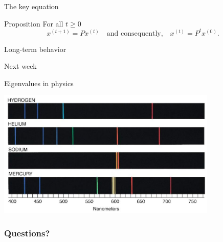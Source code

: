 \documentclass{beamer}
\begin{document}
\begin{frame}[t]{The key equation}
	\grid

	\vspace{-0.4cm}
	\begin{block}{Proposition}
		For all $t \geq 0$
		$$
		x^{(t+1)} = P x^{(t)}
		\quad \text{and consequently,} \quad
		x^{(t)} =  P^t x^{(0)}.
		$$
	\end{block}

\end{frame}

\begin{frame}[t]{Long-term behavior}
	\grid


\end{frame}

\begin{frame}[t]{Next week}
	\grid


\end{frame}
\begin{frame}{Eigenvalues in physics}
	\grid

	\includegraphics[width=10.5cm]{spectre.jpg}

\end{frame}

\appendix
\backupbegin
\begin{frame}[t]
	\frametitle{Questions?}
	\grid

	\pause
\end{frame}
\backupend
\end{document}
